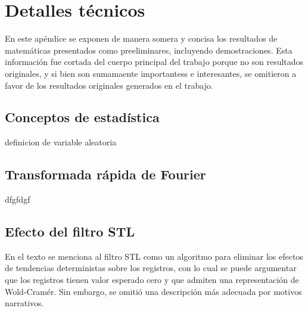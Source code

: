 \chapter{Detalles t\'ecnicos}

En este ap\'endice se exponen de manera somera y concisa los resultados de matem\'aticas 
presentados como preeliminares, incluyendo demostraciones. Esta informaci\'on fue cortada del 
cuerpo principal del trabajo porque no son resultados originales, y si bien son sumamaente
importantess e interesantes, se omitieron a favor de los resultados originales generados en el 
trabajo.


\section{Conceptos de estad\'istica}

\begin{defn}
definicion de variable aleatoria
\label{variable_aleatoria}
\end{defn}

\section{Transformada r\'apida de Fourier}

dfgfdgf


\section{Efecto del filtro STL}

En el texto se menciona al filtro STL como un algoritmo para eliminar los efectos de tendencias
deterministas sobre los registros, con lo cual se puede argumentar que los registros tienen
valor esperado cero y que admiten una representaci\'on de Wold-Cram\'er. Sin embargo, se omiti\'o
una descripci\'on m\'as adecuada por motivos narrativos.

